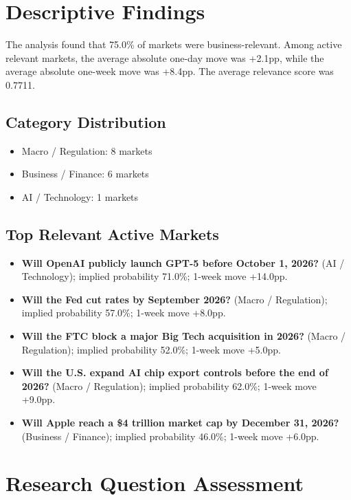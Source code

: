 \documentclass[12pt]{article}
\begin{document}
\section{Descriptive Findings}

The analysis found that 75.0\% of markets were business-relevant. Among active relevant markets, the average absolute one-day move was +2.1pp, while the average absolute one-week move was +8.4pp. The average relevance score was 0.7711.

\subsection{Category Distribution}

\begin{itemize}
\item Macro / Regulation: 8 markets
\item Business / Finance: 6 markets
\item AI / Technology: 1 markets
\end{itemize}

\subsection{Top Relevant Active Markets}

\begin{itemize}
\item \textbf{Will OpenAI publicly launch GPT-5 before October 1, 2026?} (AI / Technology); implied probability 71.0\%; 1-week move +14.0pp.
\item \textbf{Will the Fed cut rates by September 2026?} (Macro / Regulation); implied probability 57.0\%; 1-week move +8.0pp.
\item \textbf{Will the FTC block a major Big Tech acquisition in 2026?} (Macro / Regulation); implied probability 52.0\%; 1-week move +5.0pp.
\item \textbf{Will the U.S. expand AI chip export controls before the end of 2026?} (Macro / Regulation); implied probability 62.0\%; 1-week move +9.0pp.
\item \textbf{Will Apple reach a \$4 trillion market cap by December 31, 2026?} (Business / Finance); implied probability 46.0\%; 1-week move +6.0pp.
\end{itemize}

\section{Research Question Assessment}
\end{document}
